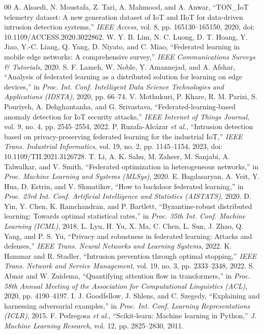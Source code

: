 \begin{thebibliography}{00}
 A. Alsaedi, N. Moustafa, Z. Tari, A. Mahmood, and A. Anwar, ``TON\_IoT telemetry dataset: A new generation dataset of IoT and IIoT for data-driven intrusion detection systems,'' \textit{IEEE Access}, vol. 8, pp. 165130--165150, 2020, doi: 10.1109/ACCESS.2020.3022862.
 W. Y. B. Lim, N. C. Luong, D. T. Hoang, Y. Jiao, Y.-C. Liang, Q. Yang, D. Niyato, and C. Miao, ``Federated learning in mobile edge networks: A comprehensive survey,'' \textit{IEEE Communications Surveys \& Tutorials}, 2020.
 S. F. Lameh, W. Noble, Y. Amannejad, and A. Afshar, ``Analysis of federated learning as a distributed solution for learning on edge devices,'' in \textit{Proc. Int. Conf. Intelligent Data Science Technologies and Applications (IDSTA)}, 2020, pp. 66--74.
 V. Mothukuri, P. Khare, R. M. Parizi, S. Pouriyeh, A. Dehghantanha, and G. Srivastava, ``Federated-learning-based anomaly detection for IoT security attacks,'' \textit{IEEE Internet of Things Journal}, vol. 9, no. 4, pp. 2545--2554, 2022.
 P. Ruzafa-Alc\'{a}zar \textit{et al.}, ``Intrusion detection based on privacy-preserving federated learning for the industrial IoT,'' \textit{IEEE Trans. Industrial Informatics}, vol. 19, no. 2, pp. 1145--1154, 2023, doi: 10.1109/TII.2021.3126728.
 T. Li, A. K. Sahu, M. Zaheer, M. Sanjabi, A. Talwalkar, and V. Smith, ``Federated optimization in heterogeneous networks,'' in \textit{Proc. Machine Learning and Systems (MLSys)}, 2020.
 E. Bagdasaryan, A. Veit, Y. Hua, D. Estrin, and V. Shmatikov, ``How to backdoor federated learning,'' in \textit{Proc. 23rd Int. Conf. Artificial Intelligence and Statistics (AISTATS)}, 2020.
 D. Yin, Y. Chen, K. Ramchandran, and P. Bartlett, ``Byzantine-robust distributed learning: Towards optimal statistical rates,'' in \textit{Proc. 35th Int. Conf. Machine Learning (ICML)}, 2018.
 L. Lyu, H. Yu, X. Ma, C. Chen, L. Sun, J. Zhao, Q. Yang, and P. S. Yu, ``Privacy and robustness in federated learning: Attacks and defenses,'' \textit{IEEE Trans. Neural Networks and Learning Systems}, 2022.
 K. Hammar and R. Stadler, ``Intrusion prevention through optimal stopping,'' \textit{IEEE Trans. Network and Service Management}, vol. 19, no. 3, pp. 2333--2348, 2022.
 S. Abnar and W. Zuidema, ``Quantifying attention flow in transformers,'' in \textit{Proc. 58th Annual Meeting of the Association for Computational Linguistics (ACL)}, 2020, pp. 4190--4197.
 I. J. Goodfellow, J. Shlens, and C. Szegedy, ``Explaining and harnessing adversarial examples,'' in \textit{Proc. Int. Conf. Learning Representations (ICLR)}, 2015.
 F. Pedregosa \textit{et al.}, ``Scikit-learn: Machine learning in Python,'' \textit{J. Machine Learning Research}, vol. 12, pp. 2825--2830, 2011.
\end{thebibliography}
